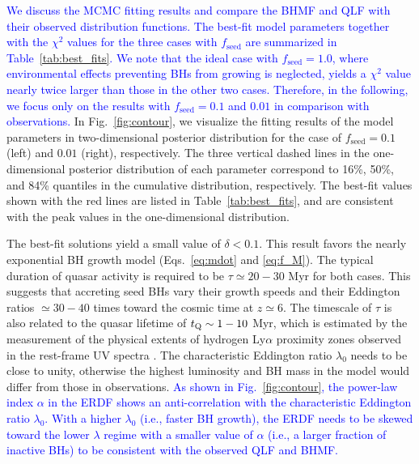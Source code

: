 \documentclass[twocolumn, twocolappendix]{aastex63}
\newcommand{\tlife}{\tau}
\newcommand{\fseed}{f_\mathrm{seed}}
\newcommand{\blue}[1]{\textcolor{blue}{ #1}}
\begin{document}
\begin{CJK*}{UTF8}{gbsn}
\blue{
We discuss the MCMC fitting results and compare the BHMF and QLF with their observed distribution functions.
The best-fit model parameters together with the $\chi^2$ values for the three cases with $\fseed$ are summarized in Table~\ref{tab:best_fits}.
We note that the ideal case with $\fseed=1.0$, where environmental effects preventing BHs from growing is neglected, yields a $\chi^2$ value 
nearly twice larger than those in the other two cases.
Therefore, in the following, we focus only on the results with $\fseed=0.1$ and $0.01$ in comparison with observations.
}
In Fig.~\ref{fig:contour}, we visualize the fitting results of the model parameters in two-dimensional 
posterior distribution for the case of $\fseed= 0.1$ (left) and $0.01$ (right), respectively.
The three vertical dashed lines in the one-dimensional posterior distribution of each parameter
correspond to 16\%, 50\%, and 84\% quantiles in the cumulative distribution, respectively.
The best-fit values shown with the red lines are listed in Table~\ref{tab:best_fits},
and are consistent with the peak values in the one-dimensional distribution.


The best-fit solutions yield a small value of $\delta < 0.1$.
This result favors the nearly exponential BH growth model (Eqs.~\ref{eq:mdot} and \ref{eq:f_M}).
The typical duration of quasar activity is required to be $\tlife \simeq 20-30$ Myr for both cases.
This suggests that accreting seed BHs vary their growth speeds and their Eddington ratios 
$\simeq 30-40$ times toward the cosmic time at $z\simeq 6$.
The timescale of $\tlife$ is also related to the quasar lifetime of $t_{\rm Q}\sim 1-10$ Myr, 
which is estimated by the measurement of the physical extents of hydrogen Ly$\alpha$ proximity zones 
observed in the rest-frame UV spectra \citep[e.g.,][]{2018ApJ...867...30E,2019ApJ...884L..19D}.
The characteristic Eddington ratio $\lambda_0$ needs to be close to unity, otherwise the highest luminosity and BH mass
in the model would differ from those in observations.
\blue{
As shown in Fig.~\ref{fig:contour}, the power-law index $\alpha$ in the ERDF shows an anti-correlation with the characteristic Eddington ratio $\lambda_0$.
With a higher $\lambda_0$ (i.e., faster BH growth), the ERDF needs to be skewed toward the lower $\lambda$ regime with a smaller value of $\alpha$ (i.e., a larger fraction of inactive BHs)
to be consistent with the observed QLF and BHMF.
}




\end{CJK*}
\end{document}
